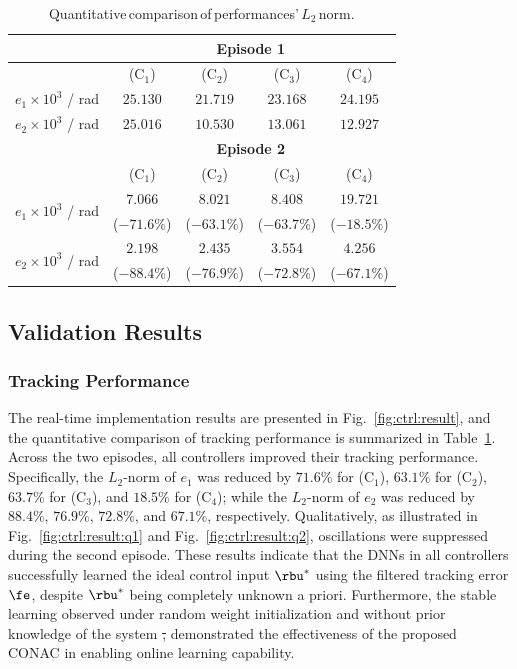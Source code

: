 \documentclass[letterpaper, journal]{IEEEtran}
\providecommand{\DIFdel}[1]{{\protect\color{red}\sout{#1}}} %
\providecommand{\DIFdelbegin}{} %
\providecommand{\DIFdelend}{} %
\begin{document}
\begin{table}[!t]
    \renewcommand{\arraystretch}{1.3}
    \caption{Quantitative\,comparison\,of\,performances'\,$L_2$\,norm.}
    \centering
    \begin{tabular}{c c c c c}
    \hline
		& \multicolumn{4}{c}{\textbf{Episode 1}} \\
    \hline
	\hline 
		& (C$_1$) & (C$_2$) & (C$_3$) & (C$_4$) \\
	\hline
		$e_1\times10^{3}$ / rad & $25.130$ & $21.719$ & $23.168$ & $24.195$ \\ 
	\hline
        $e_2\times10^{3}$ / rad & $25.016$ & $10.530$ & $13.061$ & $12.927$ \\
	\hline
        & \multicolumn{4}{c}{\textbf{Episode 2}} \\
    \hline
    \hline
        & (C$_1$) & (C$_2$) & (C$_3$) & (C$_4$) \\
	\hline
    \multirow{2}{*}{$e_1\times10^{3}$ / rad} 
        & $7.066$ & $8.021$ & $8.408$ & $19.721$ \\
        & ($-71.6\%$) & ($-63.1\%$) & ($-63.7\%$) & ($-18.5\%$) \\
    \hline
    \multirow{2}{*}{$e_2\times10^{3}$ / rad} 
        & $2.198$ & $2.435$ & $3.554$ & $4.256$ \\
        & ($-88.4\%$) & ($-76.9\%$) & ($-72.8\%$) & ($-67.1\%$) \\
    \hline
    \end{tabular}
    \label{tab:sim:L2}
\end{table}

\subsection{Validation Results}

\subsubsection{Tracking Performance}

The real-time implementation results are presented in Fig.~\ref{fig:ctrl:result}, and the quantitative comparison of tracking performance is summarized in Table~\ref{tab:sim:L2}.
Across the two episodes, all controllers improved their tracking performance. 
Specifically, the $L_2$-norm of $e_1$ was reduced by $71.6 \%$ for (C$_1$), $63.1 \%$ for (C$_2$), $63.7 \%$ for (C$_3$), and $18.5 \%$ for (C$_4$); while the $L_2$-norm of $e_2$ was reduced by $88.4 \%$, $76.9 \%$, $72.8 \%$, and $67.1 \%$, respectively.
Qualitatively, as illustrated in Fig.~\ref{fig:ctrl:result:q1} and Fig.~\ref{fig:ctrl:result:q2}, oscillations were suppressed during the second episode.
These results indicate that the DNNs in all controllers successfully learned the ideal control input $\rbu^*$ using the filtered tracking error $\fe$, despite $\rbu^*$ being completely unknown a priori.
Furthermore, the stable learning observed under random weight initialization and without prior knowledge of the system \DIFdelbegin \DIFdel{, }\DIFdelend demonstrated the effectiveness of the proposed CONAC in enabling online learning capability.
\end{document}

